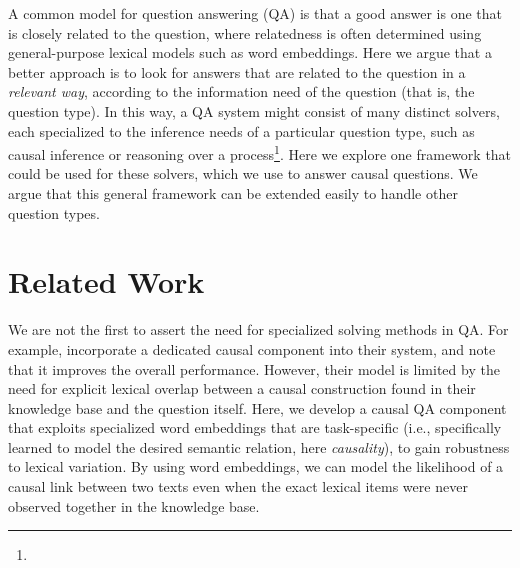 
A common model for question answering (QA) is that a good answer is one that is closely related to the question, where relatedness is often determined using general-purpose lexical models such as word embeddings. 
Here we argue that a better approach is to look for answers that are related to the question in a {\em relevant way}, according to the information need of the question (that is, the question type).
In this way, a QA system might consist of many distinct solvers, each specialized to the inference needs of a particular question type, such as causal inference or reasoning over a process\footnote{}.  Here we explore one framework that could be used for these solvers, which we use to answer causal questions.  We argue that this general framework can be extended easily to handle other question types.

\section{Related Work} 
We are not the first to assert the need for specialized solving methods in QA.  For example, \citet{oh2013question} incorporate a dedicated causal component into their system, and note that it improves the overall performance.  However, their model is limited by the need for explicit lexical overlap between a causal construction found in their knowledge base and the question itself.  Here, we develop a causal QA component that exploits specialized word embeddings that are task-specific (i.e., specifically learned to model the desired semantic relation, here \textit{causality}), to gain robustness to lexical variation.  
By using word embeddings, we can model the likelihood of a causal link between two texts even when the exact lexical items were never observed together in the knowledge base.


